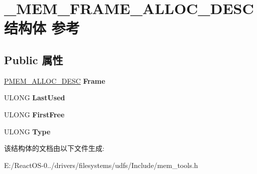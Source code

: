 \hypertarget{struct___m_e_m___f_r_a_m_e___a_l_l_o_c___d_e_s_c}{}\section{\+\_\+\+M\+E\+M\+\_\+\+F\+R\+A\+M\+E\+\_\+\+A\+L\+L\+O\+C\+\_\+\+D\+E\+S\+C结构体 参考}
\label{struct___m_e_m___f_r_a_m_e___a_l_l_o_c___d_e_s_c}
\subsection*{Public 属性}
\begin{DoxyCompactItemize}
\item 
\mbox{\label{struct___m_e_m___f_r_a_m_e___a_l_l_o_c___d_e_s_c_a551123f931e1337a2e33505319e3439f}} 
\hyperlink{struct___m_e_m___a_l_l_o_c___d_e_s_c}{P\+M\+E\+M\+\_\+\+A\+L\+L\+O\+C\+\_\+\+D\+E\+SC} {\bfseries Frame}
\item 
\mbox{\label{struct___m_e_m___f_r_a_m_e___a_l_l_o_c___d_e_s_c_a65f2b927e41e98b822b398833c84e99e}} 
U\+L\+O\+NG {\bfseries Last\+Used}
\item 
\mbox{\label{struct___m_e_m___f_r_a_m_e___a_l_l_o_c___d_e_s_c_a9dfd9fb25f522a080bbf833e123c790f}} 
U\+L\+O\+NG {\bfseries First\+Free}
\item 
\mbox{\label{struct___m_e_m___f_r_a_m_e___a_l_l_o_c___d_e_s_c_ae36680497a3be2ec3b1f8a6372db8bd3}} 
U\+L\+O\+NG {\bfseries Type}
\end{DoxyCompactItemize}


该结构体的文档由以下文件生成\+:\begin{DoxyCompactItemize}
\item 
E\+:/\+React\+O\+S-\/0../drivers/filesystems/udfs/\+Include/mem\+\_\+tools.\+h\end{DoxyCompactItemize}
